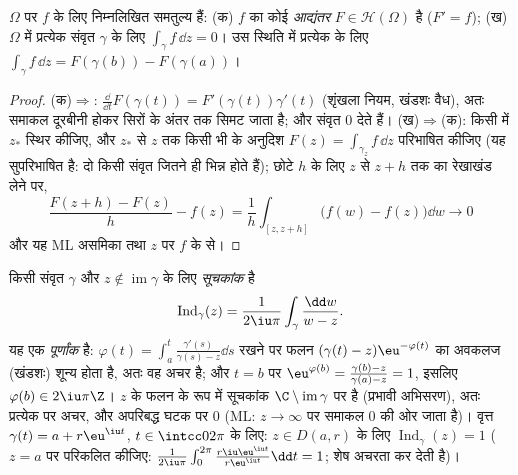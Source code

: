 \begin{proposition}[आद्यंतर]\label{prop:b3:holomorphic:primitive}
$\Omega$ पर  $f$ के लिए निम्नलिखित समतुल्य हैं: (क) $f$ का कोई
\emph{आद्यंतर} $F \in \mathcal H(\Omega)$ है ($F'
= f$); (ख) $\Omega$ में प्रत्येक संवृत 
$\gamma$ के लिए $\int_\gamma f\,\dd z = 0$। उस स्थिति में प्रत्येक  के लिए $\int_\gamma f\,\dd z =
F(\gamma(b)) - F(\gamma(a))$।
\end{proposition}

\begin{proof}
(क)$\Rightarrow$: $\frac{\dd}{\dd t}F(\gamma(t)) =
F'(\gamma(t))\gamma'(t)$ (शृंखला नियम, खंडशः वैध), अतः समाकल दूरबीनी होकर
सिरों के अंतर तक सिमट जाता है; और संवृत  $0$ देते हैं।
(ख)$\Rightarrow$(क): किसी  में $z_*$ स्थिर कीजिए, और $z_*$ से
$z$ तक किसी भी  के अनुदिश $F(z) = \int_{\gamma_z}f\,\dd z$ परिभाषित कीजिए (यह सुपरिभाषित
है: दो  किसी संवृत  जितने ही भिन्न होते हैं); छोटे $h$ के
लिए $z$ से $z + h$ तक का रेखाखंड लेने पर,
\[
\frac{F(z + h) - F(z)}{h} - f(z)
= \frac1h\int_{[z, z+h]}\bigl(f(w) - f(z)\bigr)\dd w
\longrightarrow 0
\]
और यह ML असमिका तथा $z$ पर $f$ के  से।
\end{proof}

\begin{definition}[घूर्णन संख्या]\label{def:b3:holomorphic:index}
किसी संवृत  $\gamma$ और $z \notin
\operatorname{im}\gamma$ के लिए \emph{सूचकांक} है
\[
\operatorname{Ind}_\gamma(z) = \frac1{2\iu\pi}
\int_\gamma\frac{\dd w}{w - z} .
\]
यह एक \emph{पूर्णांक} है: $\varphi(t) =
\int_a^t\frac{\gamma'(s)}{\gamma(s) - z}\dd s$ रखने पर फलन $(\gamma(t) - z)\eu^{-\varphi(t)}$ का अवकलज (खंडशः)
शून्य होता है, अतः वह अचर है; और $t = b$ पर $\eu^{\varphi(b)} =
\frac{\gamma(b) - z}{\gamma(a) - z} = 1$, इसलिए $\varphi(b) \in
2\iu\pi\Z$। $z$
के फलन के रूप में सूचकांक $\C\setminus\operatorname{im}\gamma$ पर  है (प्रभावी अभिसरण), अतः
प्रत्येक  पर अचर, और अपरिबद्ध घटक पर $0$ (ML: $z \to
\infty$ पर
समाकल $0$ की ओर जाता है)। वृत्त $\gamma(t) = a + r\eu^{\iu t}$, $t
\in \intcc0{2\pi}$ के लिए: $z
\in D(a,r)$ के लिए
$\operatorname{Ind}_\gamma(z) = 1$ ($z = a$ पर परिकलित कीजिए: $\frac1{2\iu\pi}
\int_0^{2\pi}\frac{r\iu\eu^{\iu t}}{r\eu^{\iu t}}\dd t = 1$; शेष अचरता कर देती है)।
\end{definition}

